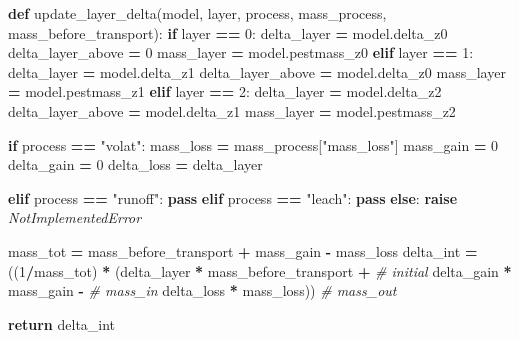 \documentclass[]{article}
\newenvironment{Shaded}{\begin{snugshade}}{\end{snugshade}}
\newcommand{\KeywordTok}[1]{\textcolor[rgb]{0.13,0.29,0.53}{\textbf{{#1}}}}
\newcommand{\DecValTok}[1]{\textcolor[rgb]{0.00,0.00,0.81}{{#1}}}
\newcommand{\StringTok}[1]{\textcolor[rgb]{0.31,0.60,0.02}{{#1}}}
\newcommand{\CommentTok}[1]{\textcolor[rgb]{0.56,0.35,0.01}{\textit{{#1}}}}
\newcommand{\ControlFlowTok}[1]{\textcolor[rgb]{0.13,0.29,0.53}{\textbf{{#1}}}}
\newcommand{\OperatorTok}[1]{\textcolor[rgb]{0.81,0.36,0.00}{\textbf{{#1}}}}
\newcommand{\PreprocessorTok}[1]{\textcolor[rgb]{0.56,0.35,0.01}{\textit{{#1}}}}
\newcommand{\NormalTok}[1]{{#1}}
\begin{document}
\begin{Shaded}
\begin{Highlighting}[]

\KeywordTok{def} \NormalTok{update_layer_delta(model, layer, process, mass_process, mass_before_transport):}
    \ControlFlowTok{if} \NormalTok{layer }\OperatorTok{==} \DecValTok{0}\NormalTok{:}
      \NormalTok{delta_layer }\OperatorTok{=} \NormalTok{model.delta_z0}
      \NormalTok{delta_layer_above }\OperatorTok{=} \DecValTok{0}
      \NormalTok{mass_layer }\OperatorTok{=} \NormalTok{model.pestmass_z0}
    \ControlFlowTok{elif} \NormalTok{layer }\OperatorTok{==} \DecValTok{1}\NormalTok{:}
        \NormalTok{delta_layer }\OperatorTok{=} \NormalTok{model.delta_z1}
        \NormalTok{delta_layer_above }\OperatorTok{=} \NormalTok{model.delta_z0}
        \NormalTok{mass_layer }\OperatorTok{=} \NormalTok{model.pestmass_z1}
    \ControlFlowTok{elif} \NormalTok{layer }\OperatorTok{==} \DecValTok{2}\NormalTok{:}
        \NormalTok{delta_layer }\OperatorTok{=} \NormalTok{model.delta_z2}
        \NormalTok{delta_layer_above }\OperatorTok{=} \NormalTok{model.delta_z1}
        \NormalTok{mass_layer }\OperatorTok{=} \NormalTok{model.pestmass_z2}
        
    \ControlFlowTok{if} \NormalTok{process }\OperatorTok{==} \StringTok{"volat"}\NormalTok{:}
        \NormalTok{mass_loss }\OperatorTok{=} \NormalTok{mass_process[}\StringTok{"mass_loss"}\NormalTok{]}
        \NormalTok{mass_gain }\OperatorTok{=} \DecValTok{0}
        \NormalTok{delta_gain }\OperatorTok{=} \DecValTok{0}
        \NormalTok{delta_loss }\OperatorTok{=} \NormalTok{delta_layer}
        
    \ControlFlowTok{elif} \NormalTok{process }\OperatorTok{==} \StringTok{"runoff"}\NormalTok{:}
        \ControlFlowTok{pass}
    \ControlFlowTok{elif} \NormalTok{process }\OperatorTok{==} \StringTok{"leach"}\NormalTok{:}
        \ControlFlowTok{pass}
    \ControlFlowTok{else}\NormalTok{:}
        \ControlFlowTok{raise} \PreprocessorTok{NotImplementedError}

    \NormalTok{mass_tot }\OperatorTok{=} \NormalTok{mass_before_transport }\OperatorTok{+} \NormalTok{mass_gain }\OperatorTok{-} \NormalTok{mass_loss}
    \NormalTok{delta_int }\OperatorTok{=} \NormalTok{((}\DecValTok{1}\OperatorTok{/}\NormalTok{mass_tot) }\OperatorTok{*}
                 \NormalTok{(delta_layer }\OperatorTok{*} \NormalTok{mass_before_transport }\OperatorTok{+}  \CommentTok{# initial}
                  \NormalTok{delta_gain }\OperatorTok{*} \NormalTok{mass_gain }\OperatorTok{-}  \CommentTok{# mass_in}
                  \NormalTok{delta_loss }\OperatorTok{*} \NormalTok{mass_loss))  }\CommentTok{# mass_out}
                  
    \ControlFlowTok{return} \NormalTok{delta_int}
                       
\end{Highlighting}
\end{Shaded}
\end{document}
